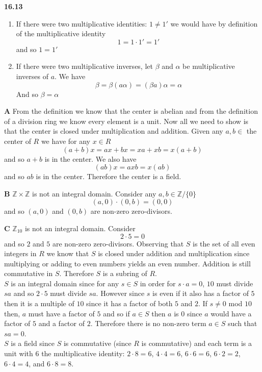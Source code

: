 \documentclass[12pt]{article}
\newenvironment{ques}{\vspace{2 ex}}{\vspace{2 ex}}
\theoremstyle{definition}
\begin{document}
\begin{ques}
	\textbf{16.13}
		\begin{enumerate}
			\item
				If there were two multiplicative identities: $1
				\neq 1'$ we would have by definition of the
				multiplicative identity
				$$1 = 1\cdot1' = 1'$$
				and so $1 = 1'$
			\item
				If there were two multiplicative inverses, let
				$\beta$ and $\alpha$ be multiplicative
				inverses of $a$. We have
				$$\beta = \beta(a \alpha) = (\beta a)\alpha =
				\alpha$$
				And so $\beta = \alpha$
		\end{enumerate}
\end{ques}

\begin{ques}
	\textbf{A}
		From the definition we know that the center is abelian and from
		the definition of a division ring we know every element is a
		unit. Now all we need to show is that the center is closed
		under multiplication and addition. Given any $a, b \in $ the
		center of $R$ we have for any $x \in R$
		$$(a + b)x = ax + bx = xa + xb = x(a + b)$$ 
		and so $a + b$ is in the center. We also have
		$$(ab)x = axb = x(ab)$$
		and so $ab$ is in the center. Therefore the center is a field.
\end{ques}

\begin{ques}
	\textbf{B}
		$\mathbb Z \times \mathbb Z$ is not an integral domain.
		Consider any $a, b \in \mathbb Z / \{0\}$
		$$(a, 0) \cdot (0, b) = (0,0)$$
		and so $(a,0)$ and $(0,b)$ are non-zero zero-divisors.
\end{ques}

\begin{ques}
	\textbf{C}
		$\mathbb Z_{10}$ is not an integral domain. Consider
		$$2 \cdot 5 = 0$$
		and so $2$ and $5$ are non-zero zero-divisors. Observing that
		$S$ is the set of all even integers in $R$ we know that $S$ is
		closed under addition and multiplication since multiplying or
		adding to even numbers yields an even number. Addition is still
		commutative in $S$. Therefore $S$ is a subring of $R$. \\
		$S$ is an integral domain since for any $s \in S$ in order for
		$s \cdot a = 0$, $10$ must divide $sa$ and so $2 \cdot 5$ must
		divide $sa$. However since $s$ is even if it also has a factor
		of $5$ then it is a multiple of $10$ since it has a factor of
		both $5$ and $2$. If $s \neq 0$ mod $10$ then, $a$ must have a
		factor of $5$ and so if $a \in S$ then $a$ is $0$ since $a$
		would have a factor of $5$ and a factor of $2$. Therefore there
		is no non-zero term $a \in S$ such that $sa = 0$.\\
		$S$ is a field since $S$ is commutative (since $R$ is
		commutative) and each term is a unit with $6$ the
		multiplicative identity: $2 \cdot 8 = 6$, $4 \cdot 4 = 6$, $6
		\cdot 6 = 6$, $6 \cdot 2 = 2$, $6 \cdot 4 = 4$, and $6 \cdot 8
		= 8$.
\end{ques}
\end{document}
